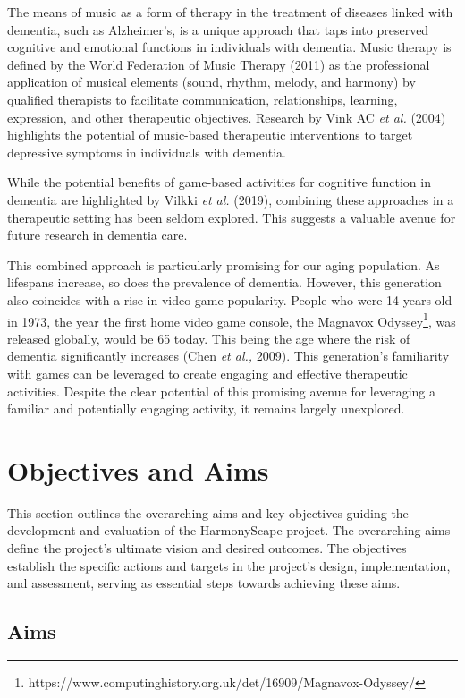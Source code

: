 \documentclass{l4proj}
\begin{document}
The means of music as a form of therapy in the treatment of diseases linked with dementia, such as Alzheimer's, is a unique approach that taps into preserved cognitive and emotional functions in individuals with dementia. Music therapy is defined by the World Federation of Music Therapy (2011) as the professional application of musical elements (sound, rhythm, melody, and harmony) by qualified therapists to facilitate communication, relationships, learning, expression, and other therapeutic objectives. Research by Vink AC \emph{et al.} (2004) highlights the potential of music-based therapeutic interventions to target depressive symptoms in individuals with dementia.

While the potential benefits of game-based activities for cognitive function in dementia are highlighted by Vilkki \emph{et al.} (2019), combining these approaches in a therapeutic setting has been seldom explored. This suggests a valuable avenue for future research in dementia care.

This combined approach is particularly promising for our aging population. As lifespans increase, so does the prevalence of dementia. However, this generation also coincides with a rise in video game popularity. People who were 14 years old in 1973, the year the first home video game console, the Magnavox Odyssey\footnote{https://www.computinghistory.org.uk/det/16909/Magnavox-Odyssey/}, was released globally, would be 65 today. This being the age where the risk of dementia significantly increases (Chen \emph{et al.,} 2009). This generation's familiarity with games can be leveraged to create engaging and effective therapeutic activities. Despite the clear potential of this promising avenue for leveraging a familiar and potentially engaging activity, it remains largely unexplored.

\section{Objectives and Aims}
This section outlines the overarching aims and key objectives guiding the development and evaluation of the HarmonyScape project. The overarching aims define the project's ultimate vision and desired outcomes. The objectives establish the specific actions and targets in the project's design, implementation, and assessment, serving as essential steps towards achieving these aims.

\subsection{Aims}
\end{document}
